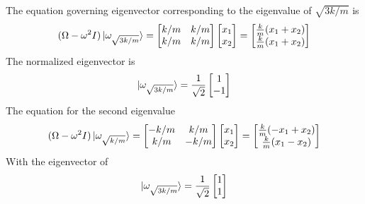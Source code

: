 \documentclass[../../../main.tex]{subfiles}
\begin{document}
The equation governing eigenvector corresponding to the eigenvalue of $\sqrt{3k/m}$ is
\begin{equation*}
	(\Omega- \omega^2 I)\ket{\omega_{\sqrt{3k/m}}}=
	\begin{bmatrix}
		k/m & k/m \\
		k/m & k/m \\
	\end{bmatrix}
	\begin{bmatrix}
		x_1 \\
		x_2 \\
	\end{bmatrix}
	=
	\begin{bmatrix}
		\frac{k }{ m }(x_1+x_2) \\
		\frac{k }{ m }(x_1+x_2) \\
	\end{bmatrix}
\end{equation*}
The normalized eigenvector is
\begin{equation*}
	\ket{\omega_{\sqrt{3k/m}}}=
	\frac{1 }{\sqrt{2}}
	\begin{bmatrix}
		1  \\
		-1 \\
	\end{bmatrix}
\end{equation*}
The equation for the second eigenvalue
\begin{equation*}
	(\Omega- \omega^2 I)\ket{\omega_{\sqrt{k/m}}}=
	\begin{bmatrix}
		-k/m & k/m  \\
		k/m  & -k/m \\
	\end{bmatrix}
	\begin{bmatrix}
		x_1 \\
		x_2 \\
	\end{bmatrix}
	=
	\begin{bmatrix}
		\frac{k }{ m }(-x_1+x_2) \\
		\frac{k }{ m }(x_1-x_2)  \\
	\end{bmatrix}
\end{equation*}
With the eigenvector of
\begin{equation*}
	\ket{\omega_{\sqrt{3k/m}}}=
	\frac{1 }{\sqrt{2}}
	\begin{bmatrix}
		1 \\
		1 \\
	\end{bmatrix}
\end{equation*}
\end{document}
